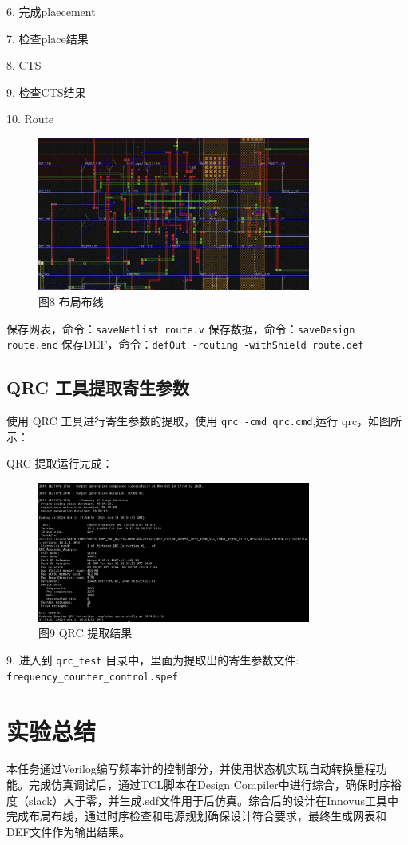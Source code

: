 6. 完成plaecement

7. 检查place结果

8. CTS

9. 检查CTS结果

10. Route

\begin{figure}[H]
    \centering
    \includegraphics[width=0.8\textwidth]{images/final-task03-09.png}
    \caption{图8 布局布线}
\end{figure}

保存网表，命令：\texttt{saveNetlist route.v}
保存数据，命令：\texttt{saveDesign route.enc}
保存DEF，命令：\texttt{defOut -routing -withShield route.def}

\subsection{QRC 工具提取寄生参数}

使用 QRC 工具进行寄生参数的提取，使用 \texttt{qrc -cmd qrc.cmd},运行 qrc，如图所示：

QRC 提取运行完成：

\begin{figure}[H]
    \centering
    \includegraphics[width=0.8\textwidth]{images/final-task03-10.png}
    \caption{图9 QRC 提取结果}
\end{figure}

9. 进入到 \texttt{qrc\_test} 目录中，里面为提取出的寄生参数文件: \texttt{frequency\_counter\_control.spef}

\section{实验总结}

本任务通过Verilog编写频率计的控制部分，并使用状态机实现自动转换量程功能。完成仿真调试后，通过TCL脚本在Design Compiler中进行综合，确保时序裕度（slack）大于零，并生成.sdf文件用于后仿真。综合后的设计在Innovus工具中完成布局布线，通过时序检查和电源规划确保设计符合要求，最终生成网表和DEF文件作为输出结果。
